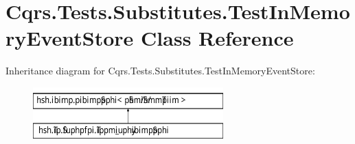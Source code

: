 \hypertarget{classCqrs_1_1Tests_1_1Substitutes_1_1TestInMemoryEventStore}{}\section{Cqrs.\+Tests.\+Substitutes.\+Test\+In\+Memory\+Event\+Store Class Reference}
\label{classCqrs_1_1Tests_1_1Substitutes_1_1TestInMemoryEventStore}
Inheritance diagram for Cqrs.\+Tests.\+Substitutes.\+Test\+In\+Memory\+Event\+Store\+:\begin{figure}[H]
\begin{center}
\leavevmode
\includegraphics[height=2.000000cm]{classCqrs_1_1Tests_1_1Substitutes_1_1TestInMemoryEventStore}
\end{center}
\end{figure}
